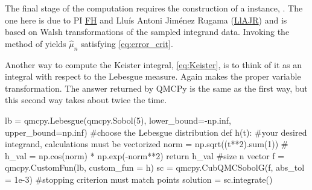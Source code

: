 \documentclass[11pt]{NSFamsart}
\newcommand{\FH}{\hyperlink{FHlink}{FH}\xspace}
\newcommand{\LlAJR}{\hyperlink{LlAJRlink}{LlAJR}\xspace}
\newcommand{\hmu}{\hat{\mu}}
\begin{document}
The final stage of the computation requires the construction of a  instance, .  The one here is due to PI \FH and \hypertarget{LlAJRlink}{Llu\'is Antoni Jim\'enez Rugama} (\LlAJR) \cite{HicJim16a} and is based on Walsh transformations of the sampled integrand data.  Invoking the  method of  yields $\hmu_n$ satisfying \eqref{eq:error_crit}.

Another way to compute the Keister integral, \eqref{eq:Keister}, is to think of it as an integral with respect to the Lebesgue measure.  Again  makes the proper variable transformation.  The answer returned by QMCPy is the same as the first way, but this second way takes about twice the time.

 \begin{pythoncode}
lb = qmcpy.Lebesgue(qmcpy.Sobol(5), lower_bound=-np.inf, upper_bound=np.inf)   #choose the Lebesgue distribution
def h(t):  #your desired integrand, calculations must be vectorized
 	norm = np.sqrt((t**2).sum(1))  #
 	h_val = np.cos(norm) * np.exp(-norm**2)
 	return h_val  #size n vector
 f = qmcpy.CustomFun(lb, custom_fun = h)
 sc = qmcpy.CubQMCSobolG(f, abs_tol = 1e-3)  #stopping criterion must match  points
 solution = sc.integrate()
 \end{pythoncode}

\end{document}
